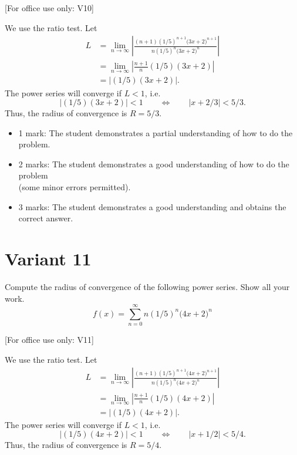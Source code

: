 \documentclass{article}
\begin{document}
[For office use only: V10]
        \medskip



    We use the ratio test. Let
      \begin{align*}
        L &= \lim_{n\to\infty} \left| 
        \frac{(n+1)\left(1/5\right)^{n+1}\big(3x + 2\big)^{n+1}}
        {n\left(1/5\right)^n \big(3x + 2\big)^n}
        \right|\\
        &= \lim_{n\to\infty} \left| \frac{n+1}{n}(1/5)(3x+2)\right| \\
        &= \left| (1/5)(3x+2)\right|.
       \end{align*}
       The power series will converge if $L < 1$, i.e.
       \[
        \left| (1/5)(3x+2)\right| < 1 \qquad\Longleftrightarrow \qquad
        \left|x + 2/3\right| < 5/3.
       \]
       Thus, the radius of convergence is $R = 5/3$.
        \medskip

            \begin{small}
            \begin{itemize}
            \item 1 mark: The student demonstrates a partial understanding of how to do the problem.
            \item 2 marks: The student demonstrates a good understanding of how to do the problem \\ (some minor errors permitted).
            \item 3 marks: The student demonstrates a good understanding and obtains the correct answer.
            \end{itemize}
            \end{small}


        \newpage
        \section{Variant 11}
        \label{v11}


Compute the radius of convergence of the following power series. Show all your work.
    \[
    f(x) = \sum_{n=0}^\infty n\left(1/5\right)^n \big(4x + 2\big)^n
    \]


[For office use only: V11]
        \medskip



    We use the ratio test. Let
      \begin{align*}
        L &= \lim_{n\to\infty} \left| 
        \frac{(n+1)\left(1/5\right)^{n+1}\big(4x + 2\big)^{n+1}}
        {n\left(1/5\right)^n \big(4x + 2\big)^n}
        \right|\\
        &= \lim_{n\to\infty} \left| \frac{n+1}{n}(1/5)(4x+2)\right| \\
        &= \left| (1/5)(4x+2)\right|.
       \end{align*}
       The power series will converge if $L < 1$, i.e.
       \[
        \left| (1/5)(4x+2)\right| < 1 \qquad\Longleftrightarrow \qquad
        \left|x + 1/2\right| < 5/4.
       \]
       Thus, the radius of convergence is $R = 5/4$.
        \medskip
\end{document}
